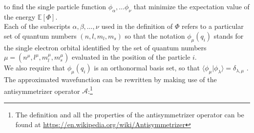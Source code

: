 to find the single particle function $\phi_{\alpha}, \dots \phi_{\nu}$ that minimize the expectation value of the energy $\mathbb{E}[\Phi]$. \\
Each of the subscripts $\alpha, \beta, \dots, \nu$ used in the definition of $\Phi$ refers to a particular set of quantum numbers $(n, l, m_l, m_s)$ so that the notation $\phi_{\mu}(q_i)$ stands for the single electron orbital identified by the set of quantum numbers $\mu = (n^\mu, l^\mu, m_l^\mu, m_s^\mu)$ evaluated in the position of the particle $i$. \\
We also require that ${\phi_{\mu}(q_i)}$ is an orthonormal basis set, so that $\langle \phi_{\mu}|\phi_{\lambda}\rangle =\delta_{\lambda, \mu} $ .\\
The approximated wavefunction can be rewritten by making use of the antisymmetrizer operator $\mathcal{A}$:\footnote{The definition and all the properties of the antisymmetrizer operator can be found at \href{https://en.wikipedia.org/wiki/Antisymmetrizer}{https://en.wikipedia.org/wiki/Antisymmetrizer}}

